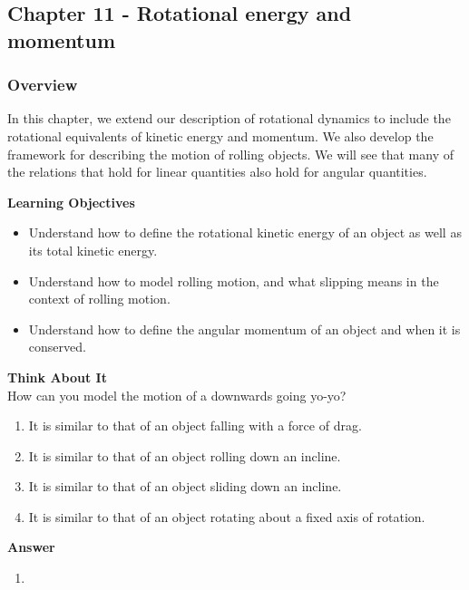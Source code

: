 \subsection{Chapter 11 - Rotational energy and momentum}

\subsubsection{Overview}\label{chapter:angularmomentumrolling}

In this chapter, we extend our description of rotational dynamics to include the rotational equivalents of kinetic energy and momentum. We also develop the framework for describing the motion of rolling objects. We will see that many of the relations that hold for linear quantities also hold for angular quantities.

\begin{framed}
\textbf{Learning Objectives}\\
\begin{itemize}
\item Understand how to define the rotational kinetic energy of an object as well as its total kinetic energy.
\item Understand how to model rolling motion, and what slipping means in the context of rolling motion.
\item Understand how to define the angular momentum of an object and when it is conserved.
\end{itemize}

\begin{framed}
\textbf{Think About It}\\
How can you model the motion of a downwards going yo-yo?

\begin{enumerate}
\item It is similar to that of an object falling with a force of drag.
\item It is similar to that of an object rolling down an incline.
\item It is similar to that of an object sliding down an incline.
\item It is similar to that of an object rotating about a fixed axis of rotation.
\end{enumerate}

\begin{framed}
\textbf{Answer}\\
\begin{enumerate}[resume]
\item
\end{enumerate}
\end{framed}
\end{framed}
\end{framed}

